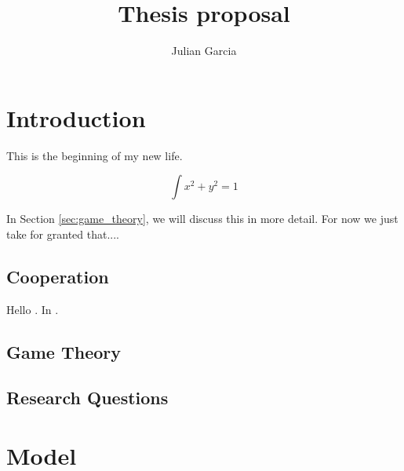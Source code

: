 \documentclass[11pt]{report}
\title{Thesis proposal}
\author{Julian Garcia}
\begin{document}
\maketitle

\chapter{Introduction}

This is the beginning of my new life.

$$\int x^2 + y ^2 = 1$$

In Section \ref{sec:game_theory}, we will discuss this in more detail.
For now we just take for granted that.... 

\section{Cooperation}

Hello \cite{garcia:JTB:2012}. In \cite{herron:SciRep:2019}.

\section{Game Theory \label{sec:game_theory}}

\section{Research Questions}

\chapter{Model}



\end{document}
